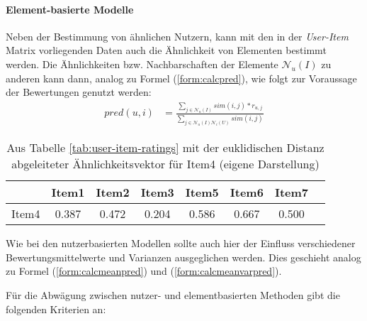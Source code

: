 \paragraph{Element-basierte Modelle} Neben der Bestimmung von ähnlichen Nutzern, kann mit den in der \textit{User-Item} Matrix vorliegenden Daten auch die Ähnlichkeit von Elementen bestimmt werden. Die Ähnlichkeiten bzw. Nachbarschaften der Elemente $\mathcal{N}_u(I)$ zu anderen kann dann, analog zu Formel (\ref{form:calcpred}), wie folgt zur Voraussage der Bewertungen genutzt werden:
\begin{align}
pred(u,i) & = \frac{ \sum_{j \in \mathcal{N}_u(I)} sim(i,j)*r_{u,j}}{ \sum_{j \in \mathcal{N}_u(I)\mathcal{N}_i(U)} sim(i,j) } \label{form:calcpreditem}
\end{align}
\begin{table}[ht]
  \centering
\begin{minipage}[b]{4in}
  \begin{tabular}{ | l || c | c | c | c | c | c | c | }
    \hline
           & Item1 & Item2 & Item3 & Item5 & Item6 & Item7 \\ \hline
Item4 &    0.387 &	0.472 &	0.204 & 0.586 & 0.667 & 0.500 \\
    \hline
  \end{tabular}
  \caption{\footnotesize Aus Tabelle \ref{tab:user-item-ratings} mit der euklidischen Distanz abgeleiteter Ähnlichkeitsvektor für Item4 { \scriptsize (eigene Darstellung)}}
  \label{tab:item-item-sim}
\end{minipage}
\end{table}
Wie bei den nutzerbasierten Modellen sollte auch hier der Einfluss verschiedener Bewertungsmittelwerte und Varianzen ausgeglichen werden. Dies geschieht analog zu Formel (\ref{form:calcmeanpred}) und (\ref{form:calcmeanvarpred}).

Für die Abwägung zwischen nutzer- und elementbasierten Methoden gibt \citep{hb_04} die folgenden Kriterien an:

